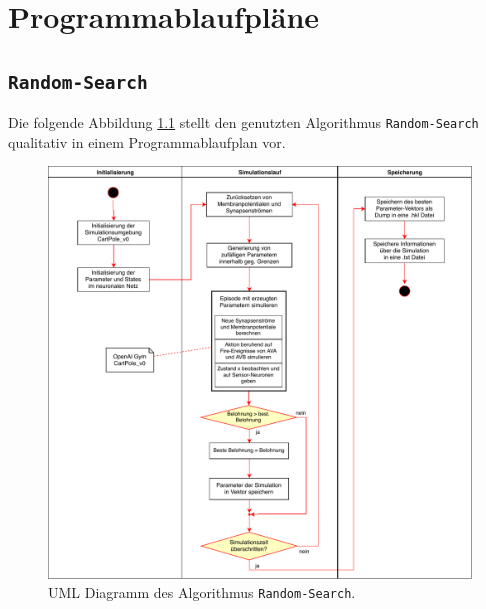 \appendix
%
\chapter{Programmablaufpläne}
\label{app:UML}
%

	\section{\texttt{Random-Search}}
	\label{app:UML_RS}
		Die folgende Abbildung \ref{fig:uml_rs} stellt den genutzten Algorithmus \texttt{Random-Search} qualitativ in einem Programmablaufplan vor.
		\begin{figure}[H]
			\centering
			\includegraphics[width=14cm]{figures/appendix/uml_rs.pdf}
			\caption{UML Diagramm des Algorithmus \texttt{Random-Search}.}
			\label{fig:uml_rs}
		\end{figure}
	
